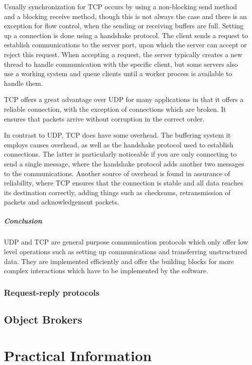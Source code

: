 \documentclass[a4paper]{article}
\begin{document}
Usually synchronization for TCP occurs by using a non-blocking send method and a blocking receive method, though this is not always the case and there is an exception for flow control, when the sending or receiving buffers are full. Setting up a connection is done using a handshake protocol. The client sends a request to establish communications to the server port, upon which the server can accept or reject this request. When accepting a request, the server typically creates a new thread to handle communication with the specific client, but some servers also use a working system and queue clients until a worker process is available to handle them.

TCP offers a great advantage over UDP for many applications in that it offers a reliable connection, with the exception of connections which are broken. It ensures that packets arrive without corruption in the correct order.

In contrast to UDP, TCP does have some overhead. The buffering system it employs causes overhead, as well as the handshake protocol used to establish connections. The latter is particularly noticeable if you are only connecting to send a single message, where the handshake protocol adds another two messages to the communications. Another source of overhead is found in assurance of reliability, where TCP ensures that the connection is stable and all data reaches its destination correctly, adding things such as checksums, retransmission of packets and acknowledgement packets.

\subparagraph*{Conclusion}

UDP and TCP are general purpose communication protocols which only offer low level operations such as setting up communications and transferring unstructured data. They are implemented efficiently and offer the building blocks for more complex interactions which have to be implemented by the software.

\subsubsection{Request-reply protocols}

\subsection{Object Brokers}

\newpage

\section{Practical Information}
\end{document}
